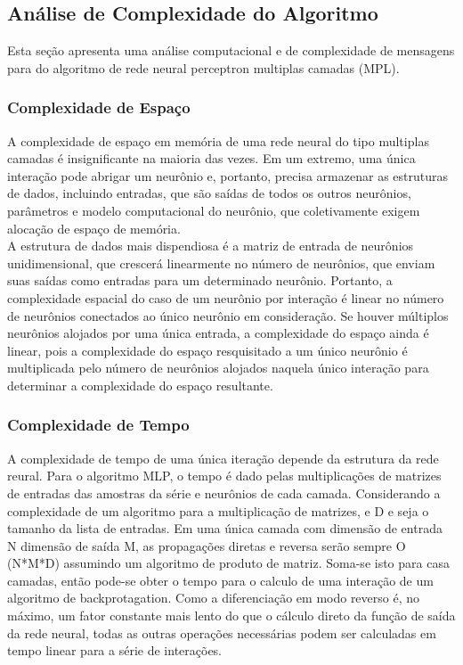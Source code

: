 \documentclass[conference]{IEEEtran}
\begin{document}
\subsection{Análise de Complexidade do Algoritmo}
Esta seção apresenta uma análise computacional e de complexidade de mensagens para do algoritmo de rede neural perceptron multiplas camadas (MPL).
 \subsubsection{Complexidade de Espaço}
 A complexidade de espaço em memória de uma rede neural do tipo multiplas camadas é insignificante na maioria das vezes. Em um extremo, uma única interação pode abrigar um neurônio e, portanto, precisa armazenar as estruturas de dados, incluindo entradas, que são saídas de todos os outros neurônios, parâmetros e modelo computacional do neurônio, que coletivamente exigem alocação de espaço de memória.\\
  A estrutura de dados mais dispendiosa é a matriz de entrada de neurônios unidimensional, que crescerá linearmente no número de neurônios, que enviam suas saídas como entradas para um determinado neurônio. Portanto, a complexidade espacial do caso de um neurônio por interação é linear no número de neurônios conectados ao único neurônio em consideração. Se houver múltiplos neurônios alojados por uma única entrada, a complexidade do espaço ainda é linear, pois a complexidade do espaço resquisitado a um único neurônio é multiplicada pelo número de neurônios alojados naquela único interação para determinar a complexidade do espaço resultante.

 \subsubsection{Complexidade de Tempo}
A complexidade de tempo de uma única iteração depende da estrutura da rede reural. Para o algoritmo MLP, o tempo é dado pelas multiplicações de matrizes de entradas das amostras da série e neurônios de cada camada. Considerando a complexidade de um algoritmo para a multiplicação de matrizes, e D e seja o tamanho da lista de entradas. Em uma única camada com dimensão de entrada N dimensão de saída M, as propagações diretas e reversa serão sempre O (N*M*D) assumindo um algoritmo de produto de matriz. Soma-se isto para casa camadas, então pode-se obter o tempo para o calculo de uma interação de um algoritmo de backprotagation. Como a diferenciação em modo reverso é, no máximo, um fator constante mais lento do que o cálculo direto da função de saída da rede neural, todas as outras operações necessárias podem ser calculadas em tempo linear para a série de interações.
\end{document}
